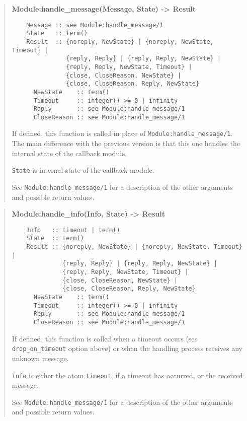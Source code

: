 \documentclass[11pt,oneside,english]{book}
\begin{document}
\begin{quote}
  \textbf{Module:handle\_message(Message, State) -> Result}
\begin{verbatim}
    Message :: see Module:handle_message/1
    State   :: term()
    Result  :: {noreply, NewState} | {noreply, NewState, Timeout} |
               {reply, Reply} | {reply, Reply, NewState} |
               {reply, Reply, NewState, Timeout} |
               {close, CloseReason, NewState} |
               {close, CloseReason, Reply, NewState}
      NewState    :: term()
      Timeout     :: integer() >= 0 | infinity
      Reply       :: see Module:handle_message/1
      CloseReason :: see Module:handle_message/1
\end{verbatim}

  If defined, this function is called in place of
  \verb+Module:handle_message/1+. The main difference with the previous version
  is that this one handles the internal state of the callback module.

  \verb+State+ is internal state of the callback module.

  See \verb+Module:handle_message/1+ for a description of the other arguments
  and possible return values.
\end{quote}

\begin{quote}
  \textbf{Module:handle\_info(Info, State) -> Result}
\begin{verbatim}
    Info   :: timeout | term()
    State  :: term()
    Result :: {noreply, NewState} | {noreply, NewState, Timeout} |
              {reply, Reply} | {reply, Reply, NewState} |
              {reply, Reply, NewState, Timeout} |
              {close, CloseReason, NewState} |
              {close, CloseReason, Reply, NewState}
      NewState    :: term()
      Timeout     :: integer() >= 0 | infinity
      Reply       :: see Module:handle_message/1
      CloseReason :: see Module:handle_message/1
\end{verbatim}

  If defined, this function is called when a timeout occurs (see
  \verb+drop_on_timeout+ option above) or when the handling process receives any
  unknown message.

  \verb+Info+ is either the atom \verb+timeout+, if a timeout has occurred, or
  the received message.

  See \verb+Module:handle_message/1+ for a description of the other arguments
  and possible return values.
\end{quote}
\end{document}
